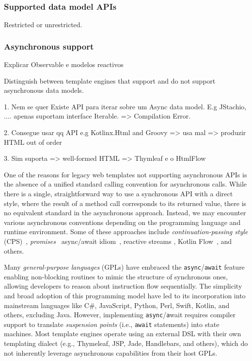 \subsubsection{Supported data model APIs}

Restricted or unrestricted.


\subsubsection{Asynchronous support}
\label{sec:async-support}

Explicar Observable e modelos reactivos

Distinguish between template engines that support and do not support asynchronous data models.

1. Nem se quer Existe API para iterar sobre um Async data model. 
   E.g JStachio, .... apenas suportam interface Iterable. => Compilation Error.

2. Consegue usar qq API e.g Kotlinx.Html and Groovy  => usa mal => produzir HTML out of order

3. Sim suporta => well-formed HTML => Thymleaf e o HtmlFlow


One of the reasons for legacy web templates not supporting asynchronous APIs
is the absence of a unified standard calling convention for asynchronous calls.
While there is a single, straightforward way to use a synchronous API with a
direct style, where the result of a method call corresponds to its returned
value, there is no equivalent standard in the asynchronous approach. 
Instead, we may encounter various asynchronous conventions depending on the
programming language and runtime environment.
Some of these approaches include \emph{continuation-passing style}
(CPS)~\cite{scheme}, \textit{promises}~\cite{promise} async/await
idiom~\cite{async_await}, reactive streams \cite{ReactiveStreams}, Kotlin
Flow~\cite{kotlinlang}, and others.

Many \textit{general-purpose languages} (GPLs) have embraced the
\texttt{async}/\texttt{await} feature~\cite{async_await} enabling non-blocking
routines to mimic the structure of synchronous ones, allowing developers to
reason about instruction flow sequentially.
The simplicity and broad adoption of this programming model have led to its
incorporation into mainstream languages like C\#, JavaScript, Python, Perl,
Swift, Kotlin, and others, excluding Java.
However, implementing \texttt{async}/\texttt{a}wait requires compiler support to
translate \textit{suspension points} (i.e., \texttt{await} statements) into state
machines. Most template engines operate using an external DSL with their own
templating dialect (e.g., Thymeleaf, JSP, Jade, Handlebars, and others), which do not
inherently leverage asynchronous capabilities from their host GPLs.

